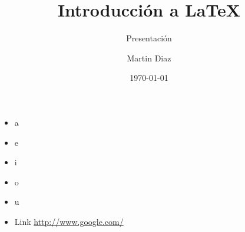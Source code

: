 \documentclass{beamer}
\title{Introducción a LaTeX}
\subtitle{Presentación}
\author{Martin Diaz}
\date{\today}
\begin{document}
	\begin{frame}
		\titlepage
	\end{frame}

	\begin{frame}
		\begin{itemize}
			\item a
			\item e
			\item i
			\item o
			\item u
			\item Link \url{http://www.google.com/ }
		\end{itemize}
	\end{frame}
\end{document}
